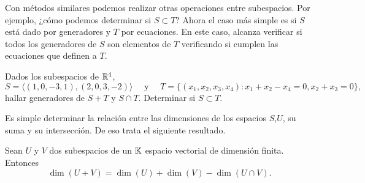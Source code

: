 Con métodos similares podemos realizar otras operaciones entre subespacios. Por ejemplo, ¿cómo podemos determinar si $S \subset T$? Ahora el caso más simple es si $S$ está dado por generadores y $T$ por ecuaciones. En este caso, alcanza verificar si todos los generadores de $S$ son elementos de $T$ verificando si cumplen las ecuaciones que definen a $T$.

\begin{ejercicio}
Dados los subespacios de $\mathbb R^4$, 
$$S = \langle (1, 0, -3, 1), (2, 0, 3, -2)\rangle \quad \text{ y } \quad T = \{(x_1, x_2, x_3, x_4): x_1+x_2-x_4 = 0, x_2 + x_3 = 0\},$$
hallar generadores de $S+T$ y $S \cap T$. Determinar si $S \subset T$.
\end{ejercicio}
Es simple determinar la relación entre las dimensiones de los espacios $S$,$U$, su suma y su intersección. De eso trata el siguiente resultado.
\begin{proposicion}\label{prop:dimsum}
Sean $U$ y $V$ dos subespacios de un $\mathbb K$ espacio vectorial de dimensión finita. Entonces
$$
\dim(U+ V) = \dim(U) + \dim(V) - \dim(U\cap V).
$$
\end{proposicion}
